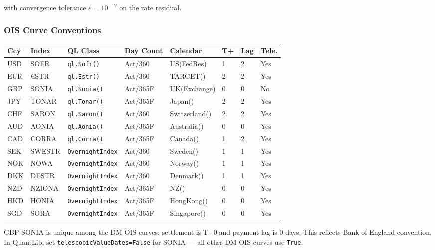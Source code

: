 \documentclass[11pt, a4paper]{article}
\begin{document}
with convergence tolerance $\varepsilon = 10^{-12}$ on the rate residual.

\subsubsection{OIS Curve Conventions}

\begin{center}
\small
\begin{tabular}{L{1.1cm} L{1.3cm} L{3.2cm} L{2.0cm} L{2.8cm} C{0.8cm} C{0.8cm} C{1.0cm}}
\toprule
\textbf{Ccy} & \textbf{Index} & \textbf{QL Class} & \textbf{Day Count} & \textbf{Calendar}
& \textbf{T+} & \textbf{Lag} & \textbf{Tele.} \\
\midrule
USD & SOFR   & \texttt{ql.Sofr()}  & Act/360   & US(FedRes)     & 1 & 2 & Yes \\
EUR & €STR   & \texttt{ql.Estr()}  & Act/360   & TARGET()       & 2 & 2 & Yes \\
GBP & SONIA  & \texttt{ql.Sonia()} & Act/365F  & UK(Exchange)   & 0 & 0 & No  \\
JPY & TONAR  & \texttt{ql.Tonar()} & Act/365F  & Japan()        & 2 & 2 & Yes \\
CHF & SARON  & \texttt{ql.Saron()} & Act/360   & Switzerland()  & 2 & 2 & Yes \\
AUD & AONIA  & \texttt{ql.Aonia()} & Act/365F  & Australia()    & 0 & 0 & Yes \\
CAD & CORRA  & \texttt{ql.Corra()} & Act/365F  & Canada()       & 1 & 2 & Yes \\
SEK & SWESTR & \texttt{OvernightIndex} & Act/360 & Sweden()     & 1 & 1 & Yes \\
NOK & NOWA   & \texttt{OvernightIndex} & Act/360 & Norway()     & 1 & 1 & Yes \\
DKK & DESTR  & \texttt{OvernightIndex} & Act/360 & Denmark()    & 1 & 1 & Yes \\
NZD & NZIONA & \texttt{OvernightIndex} & Act/365F & NZ()        & 0 & 0 & Yes \\
HKD & HONIA  & \texttt{OvernightIndex} & Act/365F & HongKong()  & 0 & 0 & Yes \\
SGD & SORA   & \texttt{OvernightIndex} & Act/365F & Singapore() & 0 & 0 & Yes \\
\bottomrule
\end{tabular}
\end{center}

\begin{tcolorbox}[warning, title={GBP SONIA Convention Note}]
GBP SONIA is unique among the DM OIS curves: settlement is T+0 and payment lag is 0 days.
This reflects Bank of England convention. In QuantLib, set
\texttt{telescopicValueDates=False} for SONIA — all other DM OIS curves use \texttt{True}.
\end{tcolorbox}
\end{document}
